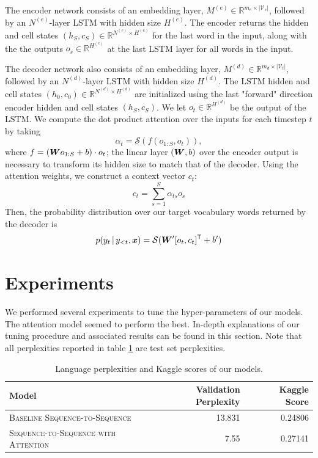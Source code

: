 \documentclass[11pt]{article}
\begin{document}
The encoder network consists of an embedding layer, $M^{(e)}\in\mathbb{R}^{m_e\times\lvert \mathcal{V}_s \rvert}$, followed by an $N^{(e)}$-layer LSTM with hidden size $H^{(e)}$. The encoder returns the hidden and cell states $(h_S, c_S)\in \mathbb{R}^{N^{(e)}\times H^{(e)}}$ for the last word in the input, along with the the outputs $o_s\in \mathbb{R}^{H^(e)}$ at the last LSTM layer for all words in the input.

The decoder network also consists of an embedding layer, $M^{(d)}\in\mathbb{R}^{m_d\times\lvert \mathcal{V}_t \rvert}$, followed by an $N^{(d)}$-layer LSTM with hidden size $H^{(d)}$. The LSTM hidden and cell states $(h_0, c_0)\in \mathbb{R}^{N^{(d)}\times H^{(d)}}$ are initialized using the last "forward" direction encoder hidden and cell states $(h_S, c_S)$. We let $o_t\in \mathbb{R}^{H^(d)}$ be the output of the LSTM. We compute the dot product attention over the inputs for each timestep $t$ by taking
\[
\alpha_t = \mathcal{S}(f(o_{1:S}, o_t)),
\]
where $f = (\boldsymbol{W} o_{1:S} + b)\cdot o_t$; the linear layer $(\boldsymbol{W}, b)$ over the encoder output is necessary to transform its hidden size to match that of the decoder. Using the attention weights, we construct a context vector $c_t$:
\[
c_t = \sum_{s=1}^S \alpha_{ts} o_s
\]
Then, the probability distribution over our target vocabulary words returned by the decoder is
\[
p(y_t\,|\, y_{<t}, \boldsymbol{x}) =
\mathcal{S}(\boldsymbol{W}' [o_t, c_t]^{\mathsf{T}} + b')
\]    


\section{Experiments}

We performed several experiments to tune the hyper-parameters of our models. The attention model seemed to perform the best. In-depth explanations of our tuning procedure and associated results can be found in this section. Note that all perplexities reported in table \ref{tab:results} are test set perplexities.

\begin{table}[H]
\centering
\begin{tabular}{llr rr}
 \toprule
 Model &  & Validation Perplexity & & Kaggle Score\\
 \midrule
 \textsc{Baseline Sequence-to-Sequence} & & 13.831 & &0.24806\\
 \textsc{Sequence-to-Sequence with Attention} & &7.55&&0.27141  \\
 \bottomrule 
\end{tabular}
\caption{\label{tab:results} Language perplexities and Kaggle scores of our models.}
\end{table}
\end{document}
